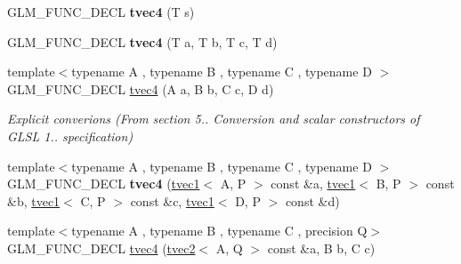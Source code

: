 \begin{DoxyCompactItemize}
\item 
\hypertarget{structglm_1_1tvec4_ae9c51d369eec8bda0997627bbd6fe3fb}{G\-L\-M\-\_\-\-F\-U\-N\-C\-\_\-\-D\-E\-C\-L {\bfseries tvec4} (T s)}\label{structglm_1_1tvec4_ae9c51d369eec8bda0997627bbd6fe3fb}

\item 
\hypertarget{structglm_1_1tvec4_aa0e3e65bb60437420428e3b3916d61a5}{G\-L\-M\-\_\-\-F\-U\-N\-C\-\_\-\-D\-E\-C\-L {\bfseries tvec4} (T a, T b, T c, T d)}\label{structglm_1_1tvec4_aa0e3e65bb60437420428e3b3916d61a5}

\item 
\hypertarget{structglm_1_1tvec4_a232c1b6ed2541a0f8f4ab865e9ae537f}{{\footnotesize template$<$typename A , typename B , typename C , typename D $>$ }\\G\-L\-M\-\_\-\-F\-U\-N\-C\-\_\-\-D\-E\-C\-L \hyperlink{structglm_1_1tvec4_a232c1b6ed2541a0f8f4ab865e9ae537f}{tvec4} (A a, B b, C c, D d)}\label{structglm_1_1tvec4_a232c1b6ed2541a0f8f4ab865e9ae537f}

\begin{DoxyCompactList}\small\item\em Explicit converions (From section 5.. Conversion and scalar constructors of G\-L\-S\-L 1.. specification) \end{DoxyCompactList}\item 
\hypertarget{structglm_1_1tvec4_a9c3452f0646e7424ee63f2974cb783db}{{\footnotesize template$<$typename A , typename B , typename C , typename D $>$ }\\G\-L\-M\-\_\-\-F\-U\-N\-C\-\_\-\-D\-E\-C\-L {\bfseries tvec4} (\hyperlink{structglm_1_1tvec1}{tvec1}$<$ A, P $>$ const \&a, \hyperlink{structglm_1_1tvec1}{tvec1}$<$ B, P $>$ const \&b, \hyperlink{structglm_1_1tvec1}{tvec1}$<$ C, P $>$ const \&c, \hyperlink{structglm_1_1tvec1}{tvec1}$<$ D, P $>$ const \&d)}\label{structglm_1_1tvec4_a9c3452f0646e7424ee63f2974cb783db}

\item 
\hypertarget{structglm_1_1tvec4_a386cc88c1d17ad4409030835f23c2f35}{{\footnotesize template$<$typename A , typename B , typename C , precision Q$>$ }\\G\-L\-M\-\_\-\-F\-U\-N\-C\-\_\-\-D\-E\-C\-L \hyperlink{structglm_1_1tvec4_a386cc88c1d17ad4409030835f23c2f35}{tvec4} (\hyperlink{structglm_1_1tvec2}{tvec2}$<$ A, Q $>$ const \&a, B b, C c)}\label{structglm_1_1tvec4_a386cc88c1d17ad4409030835f23c2f35}


\end{DoxyCompactItemize}
